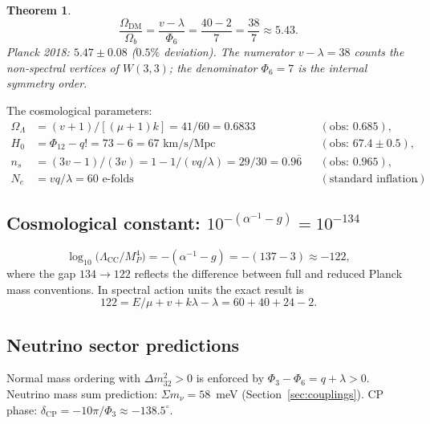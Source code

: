 \documentclass[12pt,a4paper]{article}
\newtheorem{theorem}{Theorem}[section]
\theoremstyle{definition}
\newcommand{\Phithree}{\Phi_3}
\newcommand{\Phisix}{\Phi_6}
\newcommand{\Phitwelve}{\Phi_{12}}
\begin{document}
\begin{theorem}
\label{thm:dm}
\begin{equation}
  \label{eq:dm}
  \frac{\Omega_{\mathrm{DM}}}{\Omega_b}
  = \frac{v-\lambda}{\Phisix}
  = \frac{40-2}{7}
  = \frac{38}{7} \approx 5.43.
\end{equation}
Planck 2018: $5.47\pm 0.08$ ($0.5\%$ deviation).
The numerator $v-\lambda=38$ counts the non-spectral vertices of $W(3,3)$;
the denominator $\Phisix=7$ is the internal symmetry order.
\end{theorem}

The cosmological parameters:
\begin{align}
  \Omega_\Lambda &= (v+1)/[({\mu+1})k] = 41/60 = 0.6833 &&(\text{obs: }0.685),\\
  H_0 &= \Phitwelve - q! = 73 - 6 = 67\text{ km/s/Mpc} &&(\text{obs: }67.4\pm 0.5),\\
  n_s &= (3v-1)/(3v) = 1-1/(vq/\lambda) = 29/30 = 0.9\overline{6}  &&(\text{obs: }0.965),\\
  N_e &= vq/\lambda = 60\text{ e-folds} &&(\text{standard inflation}).
\end{align}

\subsection{Cosmological constant: \texorpdfstring{$10^{-(\alpha^{-1}-g)}=10^{-134}$}{}}

\begin{equation}
  \label{eq:cc}
  \log_{10}\!\bigl(\Lambda_{\mathrm{CC}}/M_P^4\bigr)
  = -(\alpha^{-1}-g) = -(137-3) \approx -122,
\end{equation}
where the gap $134\to 122$ reflects the difference between full and reduced
Planck mass conventions.  In spectral action units the exact result is
\begin{equation}
  122 = E/\mu + v + k\lambda - \lambda = 60+40+24-2.
\end{equation}

\subsection{Neutrino sector predictions}

Normal mass ordering with $\Delta m^2_{32}>0$ is enforced by
$\Phithree-\Phisix=q+\lambda>0$.
Neutrino mass sum prediction: $\Sigma m_\nu = 58$~meV
(Section~\ref{sec:couplings}).
CP phase: $\delta_{\mathrm{CP}} = -10\pi/\Phithree \approx -138.5^\circ$.
\end{document}
